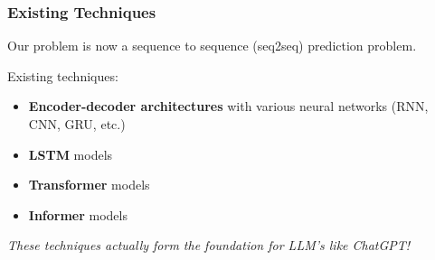 \documentclass{beamer}
\begin{document}
\begin{frame}
    \frametitle{Existing Techniques}

    Our problem is now a \alert{sequence to sequence} (seq2seq) prediction problem.
    
    Existing techniques:
    \begin{itemize}
        \item {
            \textbf{Encoder-decoder architectures} with various neural networks 
            (RNN, CNN, GRU, etc.)
        }
        \item {
            \textbf{LSTM} models
        }
        \item {
            \textbf{Transformer} models
        }
        \item {
            \textbf{Informer} models
        }
    \end{itemize}

    \emph{These techniques actually form the foundation for LLM's like ChatGPT!}
\end{frame}
\end{document}
